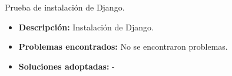 \item Prueba de instalación de Django.
  \begin{itemize}
    \item \textbf{Descripción:} Instalación de Django.
    \item \textbf{Problemas encontrados:} No se encontraron problemas.
    \item \textbf{Soluciones adoptadas:} -
  \end{itemize}

